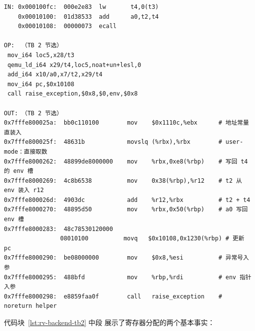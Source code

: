 \begin{lstlisting}[caption={TB 2 的三层对照节选：user-mode 下访存直接落到宿主地址，ecall 退化为 noreturn helper 调用（qemu-riscv64 -d in\_asm,op,out\_asm 节选）},label={lst:rv-backend-tb2}]
IN: 0x000100fc:  000e2e83  lw       t4,0(t3)
    0x00010100:  01d38533  add      a0,t2,t4
    0x00010108:  00000073  ecall

OP:  （TB 2 节选）
 mov_i64 loc5,x28/t3
 qemu_ld_i64 x29/t4,loc5,noat+un+lesl,0
 add_i64 x10/a0,x7/t2,x29/t4
 mov_i64 pc,$0x10108
 call raise_exception,$0x8,$0,env,$0x8

OUT: （TB 2 节选）
0x7fffe800025a:  bb0c110100        mov    $0x1110c,%ebx      # 地址常量直装入
0x7fffe800025f:  48631b            movslq (%rbx),%rbx        # user-mode：直接取数
0x7fffe8000262:  48899de8000000    mov    %rbx,0xe8(%rbp)    # 写回 t4 的 env 槽
0x7fffe8000269:  4c8b6538          mov    0x38(%rbp),%r12    # t2 从 env 装入 r12
0x7fffe800026d:  4903dc            add    %r12,%rbx          # t2 + t4
0x7fffe8000270:  48895d50          mov    %rbx,0x50(%rbp)    # a0 写回 env 槽
0x7fffe8000283:  48c78530120000
                08010100          movq   $0x10108,0x1230(%rbp) # 更新 pc
0x7fffe8000290:  be08000000        mov    $0x8,%esi          # 异常号入参
0x7fffe8000295:  488bfd            mov    %rbp,%rdi          # env 指针入参
0x7fffe8000298:  e8859faa0f        call   raise_exception    # noreturn helper
\end{lstlisting}

代码块~\ref{lst:rv-backend-tb2} 中段  展示了寄存器分配的两个基本事实：

